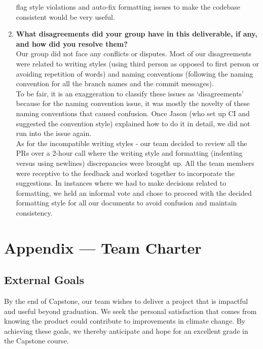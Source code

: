\documentclass{article}
\begin{document}
\begin{enumerate}
    flag style violations and auto-fix formatting issues to make the codebase consistent would be very useful.
    \item \textbf{What disagreements did your group have in this deliverable, if any,
    and how did you resolve them?}\\
    \newline
    Our group did not face any conflicts or disputes. Most of our disagreements were related to writing styles
    (using third person as opposed to first person or avoiding repetition of words) and naming conventions (following
    the naming convention for all the branch names and the commit messages).\\
    \newline
    To be fair, it is an exaggeration to classify these issues as `disagreements' because for the naming convention 
    issue, it was mostly the novelty of these naming conventions that caused confusion. Once Jason (who set up CI and
    suggested the convention style) explained how to do it in detail, we did not run into the issue again.\\
    \newline
    As for the incompatible writing styles -  our team decided to review all the PRs over a 2-hour call where the writing
    style and formatting (indenting versus using newlines) discrepancies were brought up. All the team members were
    receptive to the feedback and worked together to incorporate the suggestions. In instances where we had to make
    decisions related to formatting, we held an informal vote and chose to proceed with the decided formatting style
    for all our documents to avoid confusion and maintain consistency.
\end{enumerate}

\newpage{}

\section*{Appendix --- Team Charter \cite{ref1}}

\subsection*{External Goals}

By the end of Capstone, our team wishes to deliver a project that is impactful
and useful beyond graduation. We seek the personal satisfaction that comes from
knowing the product could contribute to improvements in climate change. By
achieving these goals, we thereby anticipate and hope for an excellent grade in
the Capstone course.
\end{document}
